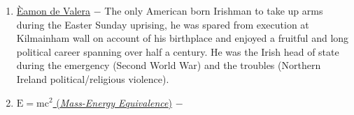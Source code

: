 \documentclass[12pt]{article}
\begin{document}
\begin{flushleft}
\begin{enumerate}
\item \underline{\`Eamon de Valera} $-$ The only American born Irishman to take up arms during the Easter Sunday uprising, he was spared from execution at  Kilmainham wall on account of his birthplace and enjoyed a fruitful and long political career spanning over half a century. He was the Irish head of state during the emergency (Second World War) and the troubles (Northern Ireland political/religious violence).

\item \underline{$\text{E}=\text{mc}^\text{2}$ (\emph{Mass-Energy Equivalence})} $-$ 
\end{enumerate}
\end{flushleft}
\end{document}
